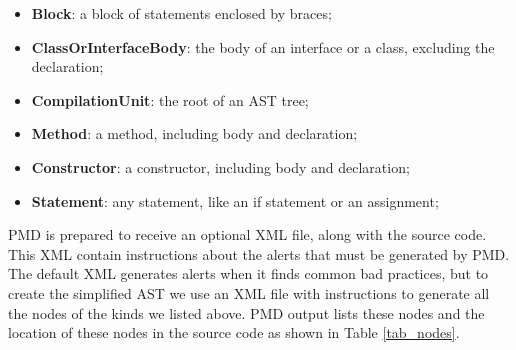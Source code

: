 \documentclass[
]{article}
\begin{document}
\begin{itemize}


\item \textbf{Block}: a block of statements enclosed by braces;

\item \textbf{ClassOrInterfaceBody}: the body of an interface or a class, excluding the declaration;

\item \textbf{CompilationUnit}: the root of an AST tree;

\item \textbf{Method}: a method, including body and declaration;

\item \textbf{Constructor}: a constructor, including body and declaration;

\item \textbf{Statement}: any statement, like an if statement or an assignment;

\end{itemize}

PMD is prepared to receive an optional XML file, along with the source
code. This XML contain instructions about the alerts that must be
generated by PMD. The default XML generates alerts when it finds common
bad practices, but to create the simplified AST we use an XML file with
instructions to generate all the nodes of the kinds we listed above. PMD
output lists these nodes and the location of these nodes in the source
code as shown in Table \ref{tab_nodes}.

\small
\end{document}
